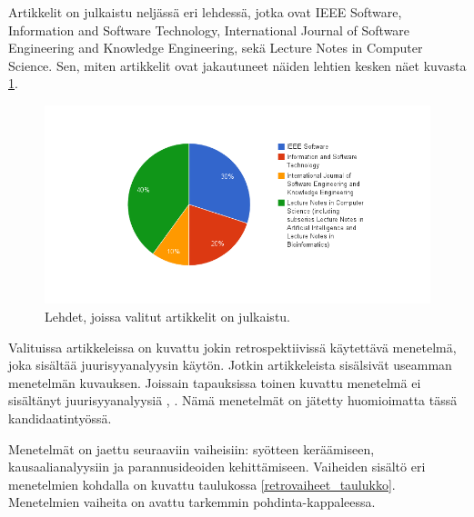 Artikkelit on julkaistu neljässä eri lehdessä, jotka ovat IEEE Software, Information and Software Technology, International Journal of Software Engineering and Knowledge Engineering, sekä Lecture Notes in Computer Science. Sen, miten artikkelit ovat jakautuneet näiden lehtien kesken näet kuvasta \ref{artikkeli_lehdet_pie}.
\begin{figure}[ht!]
\centering
\includegraphics[width=200mm]{artikkelien_lehdet.png}
\caption{Lehdet, joissa valitut artikkelit on julkaistu.}
\label{artikkeli_lehdet_pie}
\end{figure}

Valituissa artikkeleissa on kuvattu jokin retrospektiivissä käytettävä menetelmä, joka sisältää juurisyyanalyysin käytön. Jotkin artikkeleista sisälsivät useamman menetelmän kuvauksen. Joissain tapauksissa toinen kuvattu menetelmä ei sisältänyt juurisyyanalyysiä \citep{staalhane2004root}, \citep{dingsoyr2003extending}. Nämä menetelmät on jätetty huomioimatta tässä kandidaatintyössä.

Menetelmät on jaettu seuraaviin vaiheisiin: syötteen keräämiseen, kausaalianalyysiin ja parannusideoiden kehittämiseen. Vaiheiden sisältö eri menetelmien kohdalla on kuvattu taulukossa \ref{retrovaiheet_taulukko}. Menetelmien vaiheita on avattu tarkemmin pohdinta-kappaleessa.

